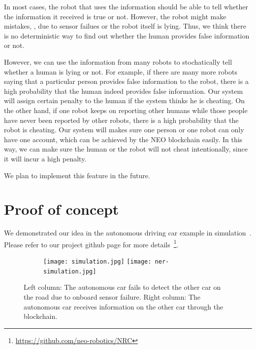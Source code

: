 \documentclass{article}
\begin{document}
In most cases, the robot that uses the information should be 
able to tell
whether the information it received is true or not. However,
the robot might make mistakes, \eg, due to sensor 
failues or the robot itself is lying.
Thus, we think there is no deterministic way to find out whether
the human provides false information or not.

However, we can use the information from many robots to
stochatically tell whether a human is lying or not. For example,
if there are many more robots saying that a particular person
provides false information to the robot, there is a high
probability that the human indeed provides false information.
Our \nrc system will assign certain penalty to the human if the
system thinks he is cheating. 
On the other hand, if one robot keeps on reporting other humans
while those people have never been reported by other robots, there
is a high probability that the robot is cheating.
Our system will
makes sure one person or one robot can only have one account, 
which can be 
achieved by the NEO blockchain easily. In this way, we can 
make sure the human or the robot will not cheat intentionally, 
since it will incur a high penalty.

We plan to implement this feature in the future.

\section{Proof of concept}
\label{sec:proof-concept}


We demonstrated our idea in the autonomous driving car example
in simulation~. 
Please refer to our project github page for more
details~\footnote{\url{https://github.com/neo-robotics/NRC}}.

\begin{figure}[!h]
    \centering
    \begin{subfigure}{1.0\linewidth}
        \centering
        \texttt{[image: simulation.jpg]}
        \hspace{1.5cm}
        \texttt{[image: ner-simulation.jpg]}
    \end{subfigure}
    \caption{Left column:
        The autonomous car fails to detect the other car on
        the road due to onboard sensor failure.
        Right column:
        The autonomous car receives information on the other
        car through the \nrc blockchain.
    }
    \label{fig:nrc_simulation}
\end{figure}
\end{document}
